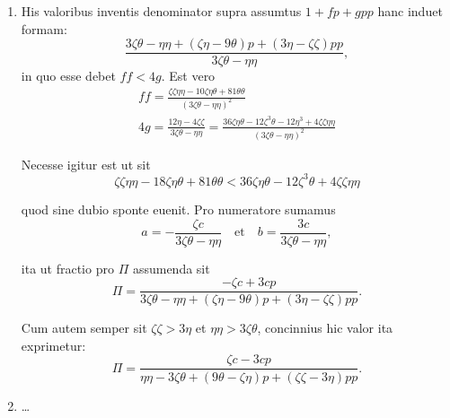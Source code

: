 \documentclass[10pt,a4paper]{article}
\newcommand{\switchenum}{\setcounter{enumi}{\arabic{enumi}-1}\switchcolumn}
\begin{document}
\begin{paracol}{2}
\begin{enumerate}[topsep=1px]
		\item His valoribus inventis denominator supra assumtus $1+fp+gpp$ hanc induet formam:
		\[
			\frac{3\zeta \theta - \eta \eta + (\zeta \eta - 9\theta)p + (3\eta -\zeta \zeta)pp}{3\zeta \theta - \eta \eta},
		\]
		in quo esse debet $ff< 4g$. Est vero
		\begin{align*}
			ff = \frac{\zeta \zeta \eta \eta -10\zeta \eta \theta + 81 \theta \theta}{(3\zeta \theta - \eta \eta)^2}\\
			4g = \frac{12\eta - 4\zeta \zeta }{3\zeta \theta-\eta \eta} = \frac{36\zeta \eta \theta - 12 \zeta ^3\theta - 12 \eta^3+4\zeta \zeta \eta \eta}{(3\zeta \theta - \eta \eta)^2}
		\end{align*}
		\par Necesse igitur est ut sit
		\[
			\zeta \zeta \eta \eta -18 \zeta \eta \theta +81 \theta \theta < 36 \zeta \eta \theta - 12 \zeta^3\theta + 4 \zeta \zeta \eta \eta
		\]
		\par quod sine dubio sponte euenit. Pro numeratore sumamus
		\[
			a = - \frac{\zeta c}{3\zeta \theta - \eta \eta} \quad \text{et}\quad b = \frac{3c}{3\zeta \theta - \eta \eta},
		\]
		\par ita ut fractio pro $\Pi$ assumenda sit
		\[
			\Pi = \frac{-\zeta c + 3cp}{3\zeta \theta -\eta \eta +(\zeta \eta - 9\theta)p+(3\eta - \zeta \zeta)pp}.
		\]
		\par Cum autem semper sit $\zeta \zeta > 3\eta$ et $\eta \eta > 3\zeta \theta$, concinnius hic valor ita exprimetur:
		\[
			\Pi = \frac{\zeta c - 3cp }{\eta \eta - 3\zeta \theta +(9\theta - \zeta \eta)p + (\zeta \zeta - 3\eta)pp}.
		\]
		
		\switchenum
		\item \ldots
		\switchcolumn*
		

\end{enumerate}
\end{paracol}
\end{document}
